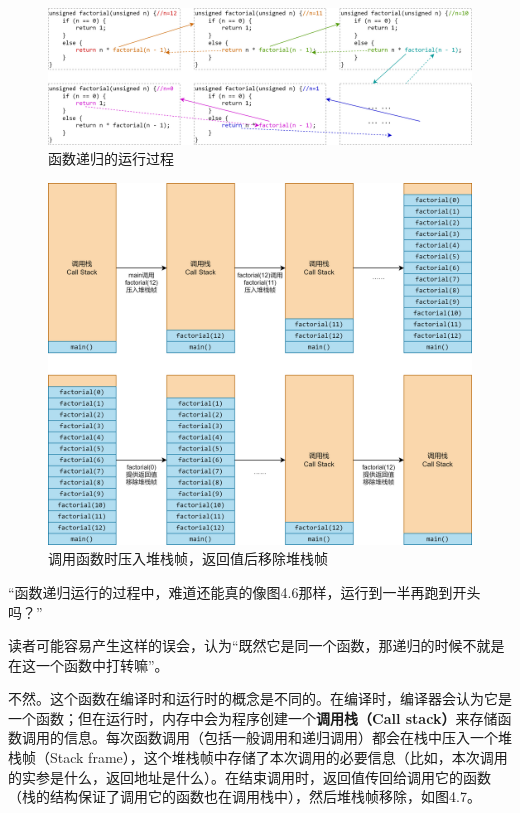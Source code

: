 \begin{figure}[htbp]
    \centering
    \includegraphics[width=\textwidth]{../images/generalized_parts/04_the_process_of_recursion.drawio.png}
    \caption{\lstinline@factorial@ 函数递归的运行过程}
\end{figure}
\begin{figure}[htbp]
    \centering
    \includegraphics[width=.8\textwidth]{.//images/generalized_parts/04_call_stack_structure.drawio.png}
    \caption{调用函数时压入堆栈帧，返回值后移除堆栈帧}    
\end{figure}
{\kaishu ``函数递归运行的过程中，难道还能真的像图4.6那样，运行到一半再跑到开头吗？''}\par
读者可能容易产生这样的误会，认为``既然它是同一个函数，那递归的时候不就是在这一个函数中打转嘛''。\par
不然。这个函数在编译时和运行时的概念是不同的。在编译时，编译器会认为它是一个函数；但在运行时，内存中会为程序创建一个\textbf{调用栈（Call stack）}来存储函数调用的信息。每次函数调用（包括一般调用和递归调用）都会在栈中压入一个堆栈帧（Stack frame），这个堆栈帧中存储了本次调用的必要信息（比如，本次调用的实参是什么，返回地址是什么）。在结束调用时，返回值传回给调用它的函数（栈的结构保证了调用它的函数也在调用栈中），然后堆栈帧移除，如图4.7。\par
